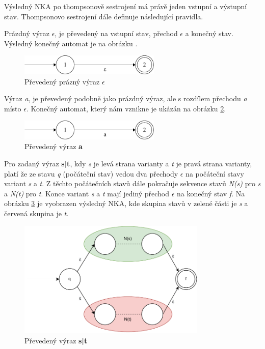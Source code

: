 Výsledný NKA po thompsonově sestrojení má právě jeden vstupní a výstupní stav. 
Thompsonovo sestrojení dále definuje následující pravidla.

Prázdný výraz \textit{$\epsilon$}, je převedený na vstupní stav, přechod \textit{$\epsilon$} a konečný stav.
Výsledný konečný automat je na obrázku \label{fig:NFAepsilon}.
\begin{figure}[!h]
	\centering
	\includegraphics[width=0.6\textwidth]{Figures/NFA_epsilon.pdf}
	\caption{Převedený prázný výraz \textbf{$\epsilon$}}
	\label{fig:NFAepsilon}
\end{figure}

Výraz \textit{a}, je převedený podobně jako prázdný výraz, ale s rozdílem přechodu \textit{a} místo \textit{$\epsilon$}.
Konečný automat, který nám vznikne je ukázán na obrázku \ref{fig:NFAa}.
\begin{figure}[!h]
	\centering
	\includegraphics[width=0.6\textwidth]{Figures/NFA_a.pdf}
	\caption{Převedený výraz \textbf{a}}
	\label{fig:NFAa}
\end{figure}

Pro zadaný výraz \textbf{s|t}, kdy \textit{s} je levá strana varianty a \textit{t} je pravá strana varianty, platí že ze stavu \textit{q} (počáteční stav) vedou dva přechody
\textit{$\epsilon$} na počáteční stavy variant \textit{s} a \textit{t}. Z těchto počátečních stavů dále pokračuje sekvence stavů \textit{N(s)} pro \textit{s} a \textit{N(t)} pro \textit{t}.
Konce variant \textit{s} a \textit{t} mají jediný přechod \textit{$\epsilon$} na konečný stav \textit{f}.
Na obrázku \ref{fig:NFAunion} je vyobrazen výsledný NKA, 
kde skupina stavů v zelené části je \textit{s} a červená skupina je \textit{t}.
\begin{figure}[!h]
	\centering
	\includegraphics[width=0.8\textwidth]{Figures/NFA_union.pdf}
	\caption{Převedený výraz \textbf{s|t}}
	\label{fig:NFAunion}
\end{figure}

